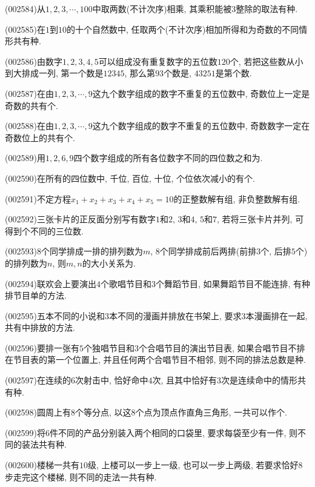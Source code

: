 \item (002584)从$1,2,3,\cdots,100$中取两数(不计次序)相乘, 其乘积能被$3$整除的取法有种.
\item (002585)在$1$到$10$的十个自然数中, 任取两个(不计次序)相加所得和为奇数的不同情形共有种.
\item (002586)由数字$1,2,3,4,5$可以组成没有重复数字的五位数$120$个, 若把这些数从小到大排成一列, 第一个数是$12345$, 那么第$93$个数是, $43251$是第个数.
\item (002587)在由$1,2,3,\cdots,9$这九个数字组成的数字不重复的五位数中, 奇数位上一定是奇数的共有个.
\item (002588)在由$1,2,3,\cdots,9$这九个数字组成的数字不重复的五位数中, 奇数数字一定在奇数位上的共有个.
\item (002589)用$1,2,6,9$四个数字组成的所有各位数字不同的四位数之和为.
\item (002590)在所有的四位数中, 千位, 百位, 十位, 个位依次减小的有个.
\item (002591)不定方程$x_1+x_2+x_3+x_4+x_5=10$的正整数解有组, 非负整数解有组.
\item (002592)三张卡片的正反面分别写有数字$1$和$2$, $3$和$4$, $5$和$7$, 若将三张卡片并列, 可得到个不同的三位数.
\item (002593)$8$个同学排成一排的排列数为$m$, $8$个同学排成前后两排(前排$3$个, 后排$5$个)的排列数为$n$, 则$m,n$的大小关系为.
\item (002594)联欢会上要演出$4$个歌唱节目和$3$个舞蹈节目, 如果舞蹈节目不能连排, 有种排节目单的方法.
\item (002595)五本不同的小说和$3$本不同的漫画并排放在书架上, 要求$3$本漫画排在一起, 共有中排放的方法.
\item (002596)要排一张有$5$个独唱节目和$3$个合唱节目的演出节目表, 如果合唱节目不排在节目表的第一个位置上, 并且任何两个合唱节目不相邻, 则不同的排法总数是种.
\item (002597)在连续的$6$次射击中, 恰好命中$4$次, 且其中恰好有$3$次是连续命中的情形共有种.
\item (002598)圆周上有$8$个等分点, 以这$8$个点为顶点作直角三角形, 一共可以作个.
\item (002599)将$6$件不同的产品分别装入两个相同的口袋里, 要求每袋至少有一件, 则不同的装法共有种.
\item (002600)楼梯一共有$10$级, 上楼可以一步上一级, 也可以一步上两级, 若要求恰好$8$步走完这个楼梯, 则不同的走法一共有种.
